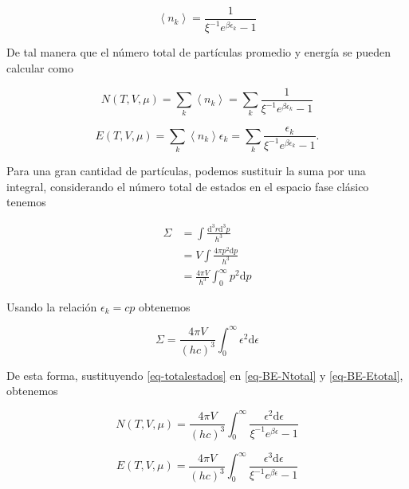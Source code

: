 \begin{equation}
\left\langle {n}_{k} \right\rangle = \frac{1}{{\xi}^{-1}{e}^{\beta{\epsilon}_{k}}-1} 
\end{equation}

De tal manera que el número total de partículas promedio y energía se pueden calcular como

\begin{equation}\label{eq-BE-Ntotal}
N(T,V,\mu)=\sum_{k}\left\langle {n}_{k} \right\rangle = \sum_{k}\frac{1}{{\xi}^{-1}{e}^{\beta{\epsilon}_{k}}-1}
\end{equation}

\begin{equation}\label{eq-BE-Etotal}
E(T,V,\mu) = \sum_{k}\left\langle {n}_{k} \right\rangle {\epsilon}_{k} = \sum_{k}\frac{{\epsilon}_{k}}{{\xi}^{-1}{e}^{\beta{\epsilon}_{k}}-1}.
\end{equation}

Para una gran cantidad de partículas, podemos sustituir la suma por una integral, considerando el número total de estados en el espacio fase clásico tenemos

\begin{equation}
\begin{split}
\Sigma &= \int \frac{\mathrm{d}^{3}r \mathrm{d}^{3}p}{{h}^{3}} \\ 
& = V\int \frac{4\pi {p}^{2} \mathrm{d}p}{{h}^{3}} \\
& = \frac{4\pi V}{{h}^{3}} \int_{0}^{\infty} {p}^{2} \mathrm{d} p 
\end{split}
\end{equation}

Usando la relación ${\epsilon}_{k} = cp$ obtenemos

\begin{equation}\label{eq-totalestados}
\Sigma = \frac{4\pi V}{(hc)^{3}} \int_{0}^{\infty} {\epsilon}^{2} \mathrm{d} \epsilon
\end{equation} 

De esta forma, sustituyendo \eqref{eq-totalestados} en \eqref{eq-BE-Ntotal} y \eqref{eq-BE-Etotal}, obtenemos

\begin{equation}\label{eq-BE-Ntotalint}
N(T,V,\mu) = \frac{4\pi V}{(hc)^{3}} \int_{0}^{\infty} \frac{{\epsilon}^{2} \mathrm{d} \epsilon}{{\xi}^{-1} {e}^{\beta \epsilon} - 1}
\end{equation}

\begin{equation}\label{eq-BE-Etotalint}
E(T,V,\mu) = \frac{4\pi V}{(hc)^{3}} \int_{0}^{\infty} \frac{{\epsilon}^{3} \mathrm{d} \epsilon}{{\xi}^{-1} {e}^{\beta \epsilon} - 1}
\end{equation}

